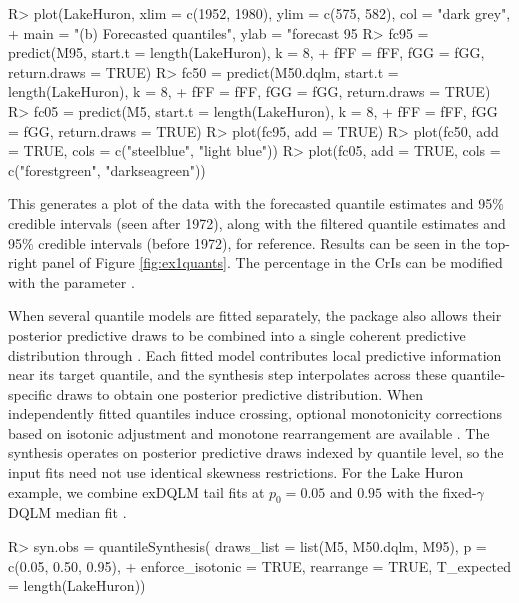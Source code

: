 \documentclass{jss}
\begin{document}
\begin{CodeChunk}
\begin{CodeInput}
R> plot(LakeHuron,  xlim = c(1952, 1980), ylim = c(575, 582), col = "dark grey",
+           main = "(b) Forecasted quantiles", ylab = "forecast 95%
R> fc95 = predict(M95, start.t = length(LakeHuron), k = 8,
+              fFF = fFF, fGG = fGG, return.draws = TRUE)
R> fc50 = predict(M50.dqlm, start.t = length(LakeHuron), k = 8,
+                fFF = fFF, fGG = fGG, return.draws = TRUE)
R> fc05 = predict(M5, start.t = length(LakeHuron), k = 8,
+                fFF = fFF, fGG = fGG, return.draws = TRUE)
R> plot(fc95, add = TRUE)
R> plot(fc50, add = TRUE, cols = c("steelblue", "light blue"))
R> plot(fc05, add = TRUE, cols = c("forestgreen", "darkseagreen"))
\end{CodeInput}
\end{CodeChunk}

This generates a plot of the data with the forecasted quantile estimates and 95\% credible intervals (seen after 1972), along with the filtered quantile estimates and 95\% credible intervals (before 1972), for reference. Results can be seen in the top-right panel of Figure \ref{fig:ex1quants}. The percentage in the CrIs can be modified with the parameter .

When several quantile models are fitted separately, the package also allows their posterior predictive draws to be combined into a single coherent predictive distribution through . Each fitted model contributes local predictive information near its target quantile, and the synthesis step interpolates across these quantile-specific draws to obtain one posterior predictive distribution. When independently fitted quantiles induce crossing, optional monotonicity corrections based on isotonic adjustment and monotone rearrangement are available \citep{barlow1972,chernozhukov2010}. The synthesis operates on posterior predictive draws indexed by quantile level, so the input fits need not use identical skewness restrictions. For the Lake Huron example, we combine exDQLM tail fits at \(p_0=0.05\) and \(0.95\) with the fixed-\(\gamma\) DQLM median fit .

\begin{CodeChunk}
\begin{CodeInput}
R> syn.obs = quantileSynthesis( draws_list = list(M5, M50.dqlm, M95), p = c(0.05, 0.50, 0.95),
+               enforce_isotonic = TRUE, rearrange = TRUE, T_expected = length(LakeHuron))
\end{CodeInput}
\end{CodeChunk}
\end{document}
